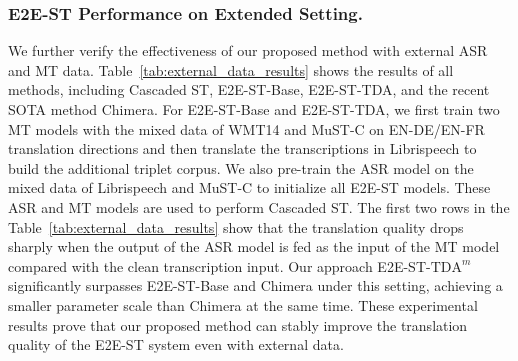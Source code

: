 \documentclass[letterpaper]{article} %
\begin{document}
\begin{table}[t]
    \normalsize
    \centering
    \caption{BLEU scores on MuST-C tst-COMMON set in an extended setting. The external data includes 960 hours of LibriSpeech ASR data and WMT14 EN-DE/FR MT data.}
    \label{tab:external_data_results}
\end{table}

\subsubsection*{E2E-ST Performance on Extended Setting.}
We further verify the effectiveness of our proposed method with external ASR and MT data.
Table~\ref{tab:external_data_results} shows the results of all methods, including Cascaded ST, E2E-ST-Base, E2E-ST-TDA, and the recent SOTA method Chimera.
For E2E-ST-Base and E2E-ST-TDA, we first train two MT models with the mixed data of WMT14 and MuST-C on EN-DE/EN-FR translation directions and then translate the transcriptions in Librispeech to build the additional triplet corpus.
We also pre-train the ASR model on the mixed data of Librispeech and MuST-C to initialize all E2E-ST models.
These ASR and MT models are used to perform Cascaded ST.
The first two rows in the Table~\ref{tab:external_data_results} show that the translation quality drops sharply when the output of the ASR model is fed as the input of the MT model compared with the clean transcription input. %
Our approach E2E-ST-$\text{TDA}^{m}$ significantly surpasses E2E-ST-Base and Chimera under this setting, achieving a smaller parameter scale than Chimera at the same time.
These experimental results prove that our proposed method can stably improve the translation quality of the E2E-ST system even with external data.
\end{document}
